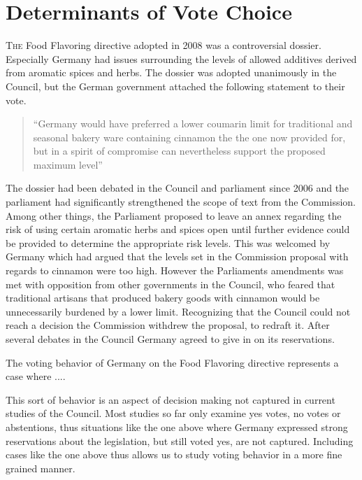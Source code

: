 
\chapter{Determinants of Vote Choice}
\label{chapter:votechoice}

\lettrine{T}{he} Food Flavoring directive adopted in 2008 was a controversial dossier. Especially Germany had issues surrounding the levels of allowed additives derived from aromatic spices and herbs. The dossier was adopted unanimously in the Council, but the German government attached the following statement to their vote. 

\begin{quote}
  ``Germany would have preferred a lower coumarin limit for traditional and seasonal bakery ware containing cinnamon the the one now provided for, but in a spirit of compromise can nevertheless support the proposed maximum level''
\end{quote}

 The dossier had been debated in the Council and parliament since 2006 and the parliament had significantly strengthened the scope of text from the Commission. Among other things, the Parliament proposed to leave an annex regarding the risk of using certain aromatic herbs and spices open until further evidence could be provided to determine the appropriate risk levels. This was welcomed by Germany which had argued that the levels set in the Commission proposal with regards to cinnamon were too high. However the Parliaments amendments was met with opposition from other governments in the Council, who feared that traditional artisans that produced bakery goods with cinnamon would be unnecessarily burdened by a lower limit.  Recognizing that the Council could not reach a decision the Commission withdrew the proposal, to redraft it. After several debates in the Council Germany agreed to give in on its reservations. 

The voting behavior of Germany on the Food Flavoring directive represents a case where  ....

This sort of behavior is an aspect of decision making not captured in current studies of the Council.  Most studies so far only examine yes votes, no votes or abstentions, thus situations like the one above where Germany expressed strong reservations about the legislation, but still voted yes, are not captured. Including cases like the one above thus allows us to study voting behavior in a more fine grained manner.

